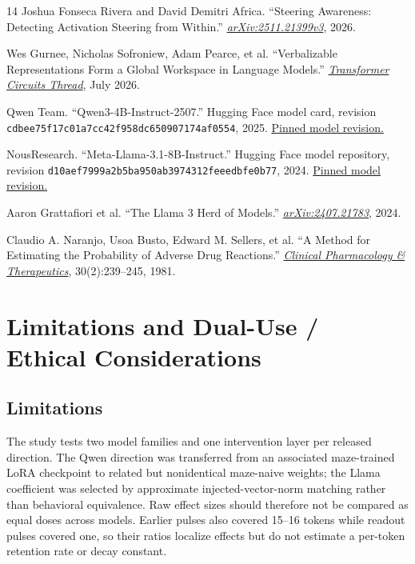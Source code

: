 \documentclass[10pt,twocolumn]{article}
\begin{document}
\begin{thebibliography}{14}
Joshua Fonseca Rivera and David Demitri Africa.
``Steering Awareness: Detecting Activation Steering from Within.''
\href{https://arxiv.org/abs/2511.21399}{\emph{arXiv:2511.21399v3}}, 2026.

Wes Gurnee, Nicholas Sofroniew, Adam Pearce, et al.
``Verbalizable Representations Form a Global Workspace in Language Models.''
\href{https://transformer-circuits.pub/2026/workspace/index.html}{\emph{Transformer Circuits Thread}}, July 2026.

Qwen Team.
``Qwen3-4B-Instruct-2507.''
Hugging Face model card, revision \nolinkurl{cdbee75f17c01a7cc42f958dc650907174af0554}, 2025.
\href{https://huggingface.co/Qwen/Qwen3-4B-Instruct-2507/tree/cdbee75f17c01a7cc42f958dc650907174af0554}{Pinned model revision.}

NousResearch.
``Meta-Llama-3.1-8B-Instruct.''
Hugging Face model repository, revision \nolinkurl{d10aef7999a2b5ba950ab3974312feeedbfe0b77}, 2024.
\href{https://huggingface.co/NousResearch/Meta-Llama-3.1-8B-Instruct/tree/d10aef7999a2b5ba950ab3974312feeedbfe0b77}{Pinned model revision.}

Aaron Grattafiori et al.
``The Llama 3 Herd of Models.''
\href{https://arxiv.org/abs/2407.21783}{\emph{arXiv:2407.21783}}, 2024.

Claudio A. Naranjo, Usoa Busto, Edward M. Sellers, et al.
``A Method for Estimating the Probability of Adverse Drug Reactions.''
\href{https://doi.org/10.1038/clpt.1981.154}{\emph{Clinical Pharmacology \& Therapeutics}}, 30(2):239--245, 1981.

\end{thebibliography}

\appendix
\footnotesize

\section[Limitations and Dual-Use / Ethical Considerations]{Limitations and Dual-Use /\\ Ethical Considerations}

\subsection{Limitations}

The study tests two model families and one intervention layer per released direction. The Qwen direction was transferred from an associated maze-trained LoRA checkpoint to related but nonidentical maze-naive weights; the Llama coefficient was selected by approximate injected-vector-norm matching rather than behavioral equivalence. Raw effect sizes should therefore not be compared as equal doses across models. Earlier pulses also covered 15--16 tokens while readout pulses covered one, so their ratios localize effects but do not estimate a per-token retention rate or decay constant.
\end{document}
